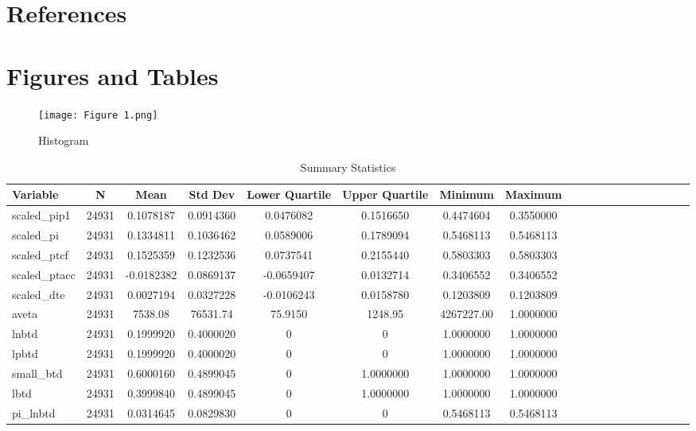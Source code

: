 \documentclass{article}
\begin{document}
\newpage

\section{References}


\newpage

\section{Figures and Tables}

\begin{figure}[htbp]
    \centering
    \texttt{[image: Figure 1.png]}
    \caption{Histogram}
\end{figure}

\begin{table}[htbp]
\centering
\caption{Summary Statistics}
\label{tab:summary_statistics}
\begin{adjustbox}{max width=\textwidth}
\begin{tabular}{|l|c|c|c|c|c|c|c|c|c|c|c|c|c|c|c|c|c|c|}
\hline
Variable & N & Mean & Std Dev & Lower Quartile & Upper Quartile & Minimum & Maximum \\
\hline
scaled\_pip1 & 24931 & 0.1078187 & 0.0914360 & 0.0476082 & 0.1516650 & 0.4474604 & 0.3550000 \\
scaled\_pi & 24931 & 0.1334811 & 0.1036462 & 0.0589006 & 0.1789094 & 0.5468113 & 0.5468113 \\
scaled\_ptcf & 24931 & 0.1525359 & 0.1232536 & 0.0737541 & 0.2155440 & 0.5803303 & 0.5803303 \\
scaled\_ptacc & 24931 & -0.0182382 & 0.0869137 & -0.0659407 & 0.0132714 & 0.3406552 & 0.3406552 \\
scaled\_dte & 24931 & 0.0027194 & 0.0327228 & -0.0106243 & 0.0158780 & 0.1203809 & 0.1203809 \\
aveta & 24931 & 7538.08 & 76531.74 & 75.9150 & 1248.95 & 4267227.00 & 1.0000000 \\
lnbtd & 24931 & 0.1999920 & 0.4000020 & 0 & 0 & 1.0000000 & 1.0000000 \\
lpbtd & 24931 & 0.1999920 & 0.4000020 & 0 & 0 & 1.0000000 & 1.0000000 \\
small\_btd & 24931 & 0.6000160 & 0.4899045 & 0 & 1.0000000 & 1.0000000 & 1.0000000 \\
lbtd & 24931 & 0.3999840 & 0.4899045 & 0 & 1.0000000 & 1.0000000 & 1.0000000 \\
pi\_lnbtd & 24931 & 0.0314645 & 0.0829830 & 0 & 0 & 0.5468113 & 0.5468113 \\

\end{tabular}
\end{adjustbox}
\end{table}
\end{document}
